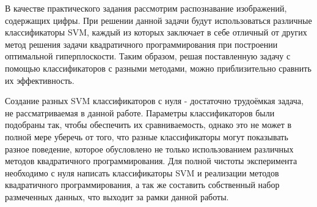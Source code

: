 \documentclass[12pt,a4paper]{article}
\begin{document}
В качестве практического задания рассмотрим распознавание изображений, содержащих цифры. При решении данной задачи будут использоваться различные классификаторы SVM, каждый из которых заключает в себе отличный от других метод решения задачи квадратичного программирования при построении оптимальной гиперплоскости. Таким образом, решая поставленную задачу с помощью классификаторов с разными методами, можно приблизительно сравнить их эффективность. 

Создание разных SVM классификаторов с нуля - достаточно трудоёмкая задача, не рассматриваемая в данной работе. Параметры классификаторов были подобраны так, чтобы обеспечить их сравниваемость, однако это не может в полной мере уберечь от того, что разные классификаторы могут показывать разное поведение, которое обусловлено не только использованием различных методов квадратичного программирования. Для полной чистоты эксперимента необходимо с нуля написать классификаторы SVM и реализации методов квадратичного программирования, а так же составить собственный набор размеченных данных, что выходит за рамки данной работы.
\end{document}
